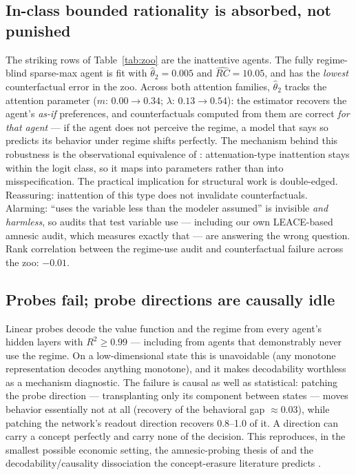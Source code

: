 \documentclass[11pt]{article}
\newcommand{\rhat}{\widehat{RC}}
\newcommand{\that}[1]{\widehat{\theta}_{#1}}
\begin{document}
\subsection{In-class bounded rationality is absorbed, not punished}
\label{sec:inclass}
The striking rows of Table~\ref{tab:zoo} are the inattentive agents. The
fully regime-blind sparse-max agent is fit with $\that{2} = 0.005$ and
$\rhat = 10.05$, and has the \emph{lowest} counterfactual error in the zoo.
Across both attention families, $\that{2}$ tracks the attention parameter
($m$: $0.00 \to 0.34$; $\lambda$: $0.13 \to 0.54$): the estimator recovers
the agent's \emph{as-if} preferences, and counterfactuals computed from them
are correct \emph{for that agent} --- if the agent does not perceive the
regime, a model that says so predicts its behavior under regime shifts
perfectly. The mechanism behind this robustness is the observational
equivalence of \citet{fosgerau2020}: attenuation-type inattention stays
within the logit class, so it maps into parameters rather than into
misspecification. The practical implication for structural work is
double-edged. Reassuring: inattention of this type does not invalidate
counterfactuals. Alarming: ``uses the variable less than the modeler
assumed'' is invisible \emph{and harmless}, so audits that test variable
use --- including our own LEACE-based amnesic audit, which measures exactly
that --- are answering the wrong question. Rank correlation between the
regime-use audit and counterfactual failure across the zoo: $-0.01$.

\subsection{Probes fail; probe directions are causally idle}
\label{sec:probes}
Linear probes \citep{alainbengio2016} decode the value function and the
regime from every agent's hidden layers with $R^2 \geq 0.99$ --- including
from agents that demonstrably never use the regime. On a low-dimensional
state this is unavoidable (any monotone representation decodes anything
monotone), and it makes decodability worthless as a mechanism diagnostic.
The failure is causal as well as statistical: patching the probe direction
--- transplanting only its component between states --- moves behavior
essentially not at all (recovery of the behavioral gap $\approx 0.03$),
while patching the network's readout direction recovers 0.8--1.0 of it.
A direction can carry a concept perfectly and carry none of the decision.
This reproduces, in the smallest possible economic setting, the
amnesic-probing thesis of \citet{elazar2021} and the decodability/causality
dissociation the concept-erasure literature predicts \citep{ravfogel2020,
belrose2023}.
\end{document}
